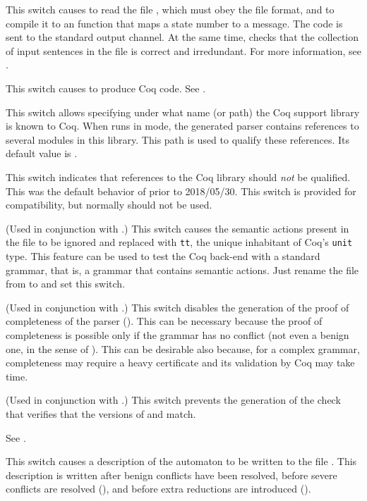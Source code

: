 \documentclass[onecolumn,11pt,nocopyrightspace,preprint]{sigplanconf}
\begin{document}
 This switch causes \menhir to read the
file , which must obey the \messages file format, and to compile
it to an \ocaml function that maps a state number to a message. The \ocaml code
is sent to the standard output channel. At the same time, \menhir checks that
the collection of input sentences in the file  is correct and
irredundant. For more information, see .

\docswitch{\ocoq} This switch causes \menhir to produce Coq code. See .

 This switch allows specifying under what
name (or path) the Coq support library is known to Coq. When \menhir runs in
\ocoq mode, the generated parser contains references to several modules in
this library. This path is used to qualify these references. Its default value
is \coqmenhirlib.

\docswitch{\ocoqlibnopath} This switch indicates that references to the Coq
library \coqmenhirlib should \emph{not} be qualified. This was the default
behavior of \menhir prior to 2018/05/30. This switch is provided for
compatibility, but normally should not be used.

\docswitch{\ocoqnoactions} (Used in conjunction with \ocoq.) This switch
causes the semantic actions present in the \vy file to be ignored and
replaced with \verb+tt+, the unique inhabitant of Coq's \verb+unit+ type. This
feature can be used to test the Coq back-end with a standard grammar, that is, a
grammar that contains \ocaml semantic actions. Just rename the file from
\mly to \vy and set this switch.

\docswitch{\ocoqnocomplete} (Used in conjunction with \ocoq.) This switch
disables the generation of the proof of completeness of the parser
(). This can be necessary because the proof of completeness is
possible only if the grammar has no conflict (not even a benign one, in the
sense of ). This can be desirable also because, for
a complex grammar, completeness may require a heavy certificate and its
validation by Coq may take time.

\docswitch{\ocoqnoversioncheck} (Used in conjunction with \ocoq.) This switch
prevents the generation of the check that verifies that the versions of
\menhir and \coqmenhirlib match.

\docswitch{\odepend} See .

\docswitch{\odump} This switch causes a description of the automaton to be
written to the file \automaton. This description is written after
benign conflicts have been resolved, before severe conflicts are resolved
(), and before extra reductions are introduced
().
\end{document}

